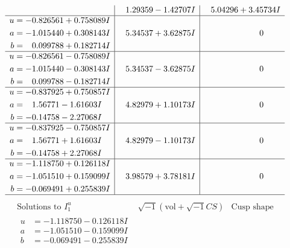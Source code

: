 \documentclass[1p]{elsarticle_modified}
\theoremstyle{definition}
\newcommand{\I}{\sqrt{-1}}
\begin{document}
$$\begin{array}{c|c|c}
 & \phantom{-}1.29359 - 1.42707 I & \phantom{-}5.04296 + 3.45734 I \\ \hline\begin{aligned}
u &= -0.826561 + 0.758089 I \\
a &= -1.015440 + 0.308143 I \\
b &= \phantom{-}0.099788 + 0.182714 I\end{aligned}
 & \phantom{-}5.34537 + 3.62875 I & \phantom{-0.000000 } 0 \\ \hline\begin{aligned}
u &= -0.826561 - 0.758089 I \\
a &= -1.015440 - 0.308143 I \\
b &= \phantom{-}0.099788 - 0.182714 I\end{aligned}
 & \phantom{-}5.34537 - 3.62875 I & \phantom{-0.000000 } 0 \\ \hline\begin{aligned}
u &= -0.837925 + 0.750857 I \\
a &= \phantom{-}1.56771 - 1.61603 I \\
b &= -0.14758 - 2.27068 I\end{aligned}
 & \phantom{-}4.82979 + 1.10173 I & \phantom{-0.000000 } 0 \\ \hline\begin{aligned}
u &= -0.837925 - 0.750857 I \\
a &= \phantom{-}1.56771 + 1.61603 I \\
b &= -0.14758 + 2.27068 I\end{aligned}
 & \phantom{-}4.82979 - 1.10173 I & \phantom{-0.000000 } 0 \\ \hline\begin{aligned}
u &= -1.118750 + 0.126118 I \\
a &= -1.051510 + 0.159099 I \\
b &= -0.069491 + 0.255839 I\end{aligned}
 & \phantom{-}3.98579 + 3.78181 I & \phantom{-0.000000 } 0\\
 \hline 
 \end{array}$$\newpage$$\begin{array}{c|c|c}  
\text{Solutions to }I^u_{1}& \I (\text{vol} + \sqrt{-1}CS) & \text{Cusp shape}\\
 \hline 
\begin{aligned}
u &= -1.118750 - 0.126118 I \\
a &= -1.051510 - 0.159099 I \\
b &= -0.069491 - 0.255839 I\end{aligned}

\end{array}$$
\end{document}
